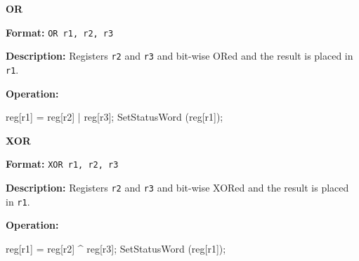 \noindent\textsf{\textbf{\Large OR}}\par
{}\par\begin{indented}{\bf Format:}
{\tt OR r1, r2, r3}\par\vspace{3ex}
\end{indented}\vspace{4ex}
\begin{indented}{\bf Description:}
Registers {\tt r2} and {\tt r3} and bit-wise ORed and the result is
placed in {\tt r1}.
\end{indented}
\begin{indented}{\bf Operation:}\vspace{.8ex}
\begin{verbatimtab}
reg[r1] = reg[r2] | reg[r3];
SetStatusWord (reg[r1]);
\end{verbatimtab}
\end{indented}
\vspace{2em}

\newpage
\noindent\textsf{\textbf{\Large XOR}}\par
{}\par\begin{indented}{\bf Format:}
{\tt XOR r1, r2, r3}\par\vspace{3ex}
\end{indented}\vspace{4ex}
\begin{indented}{\bf Description:}
Registers {\tt r2} and {\tt r3} and bit-wise XORed and the result is
placed in {\tt r1}.
\end{indented}
\begin{indented}{\bf Operation:}\vspace{.8ex}
\begin{verbatimtab}
reg[r1] = reg[r2] ^ reg[r3];
SetStatusWord (reg[r1]);
\end{verbatimtab}
\end{indented}
\vspace{2em}

